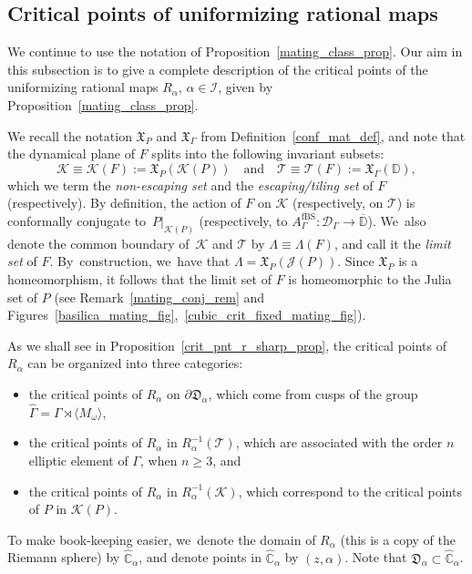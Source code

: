 \documentclass[JEP,XML,SOM,Unicode,NoFloatCountersInSection,published]{cedram}
\theoremstyle{definition}
\theoremstyle{remark}
\newcommand{\C}{\mathbb{C}}
\newcommand{\D}{\mathbb{D}}
\newcommand{\cT}{\mathcal{T}}
\newcommand{\cK}{\mathcal{K}}
\begin{document}
\subsection{Critical points of uniformizing rational maps}\label{unif_rat_crit_pnt_subsec}

We continue to use the notation of Proposition~\ref{mating_class_prop}. Our aim in this subsection is to give a complete description of the critical points of the uniformizing rational maps $R_\alpha$, $\alpha\in\mathcal{I}$, given by Proposition~\ref{mating_class_prop}.

We recall the notation $\mathfrak{X}_P$ and $\mathfrak{X}_\Gamma$ from Definition~\ref{conf_mat_def}, and note that the dynamical plane of $F$ splits into the following invariant subsets:
\[
\mathcal{K}\equiv\mathcal{K}(F):=\mathfrak{X}_P(\cK(P))\quad \mathrm{and}\quad \cT\equiv\cT(F):=\mathfrak{X}_\Gamma(\D),
\]
which we term the \emph{non-escaping set} and the \emph{escaping/tiling set} of $F$ (respectively).
By definition, the action of $F$ on $\mathcal{K}$ (respectively, on $\cT$) is conformally conjugate to~$P\vert_{\mathcal{K}(P)}$ (respectively, to $A_{\Gamma}^{\mathrm{fBS}}:\mathcal{D}_{\Gamma}\to\overline{\D}$). We~also denote the common boundary of~$\mathcal{K}$ and $\cT$ by $\Lambda\equiv\Lambda(F)$, and call it the \emph{limit set} of $F$. By~construction, we~have that $\Lambda=\mathfrak{X}_P(\mathcal{J}(P))$. Since $\mathfrak{X}_P$ is a homeomorphism, it follows that the limit set of $F$ is homeomorphic to the Julia set of $P$ (see Remark~\ref{mating_conj_rem} and Figures~\ref{basilica_mating_fig},~\ref{cubic_crit_fixed_mating_fig}).

As we shall see in Proposition~\ref{crit_pnt_r_sharp_prop}, the critical points of $R_\alpha$ can be organized into three categories:
\begin{itemize}
\item the critical points of $R_\alpha$ on $\partial\mathfrak{D}_\alpha$, which come from cusps of the group $\widehat{\Gamma}=\Gamma\rtimes \langle M_\omega\rangle$,
\item the critical points of $R_\alpha$ in $R_\alpha^{-1}(\cT)$, which are associated with the order $n$ elliptic element of $\Gamma$, when $n\geq 3$, and
\item the critical points of $R_\alpha$ in $R_\alpha^{-1}(\cK)$, which correspond to the critical points of $P$ in $\cK(P)$.
\end{itemize}

To make book-keeping easier, we~denote the domain of $R_\alpha$ (this is a copy of the Riemann sphere) by $\widehat{\C}_\alpha$, and denote points in $\widehat{\C}_\alpha$ by $(z,\alpha)$. Note that $\mathfrak{D}_\alpha \subset\widehat{\C}_\alpha$.
\end{document}
